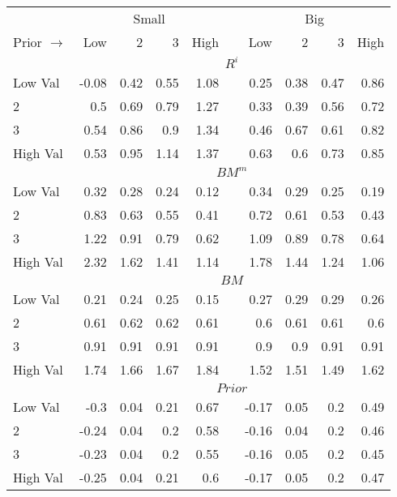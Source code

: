 
\begin{tabular}{lrrrrlrrrr}
  \toprule
    & \multicolumn{4}{c}{Small} & & \multicolumn{4}{c}{Big} \\
      \cmidrule(r){2-5} \cmidrule(r){7-10}
  Prior $\rightarrow$ & Low & 2 & 3 & High & & Low & 2 & 3 & High \\ 
  \midrule
  

    & \multicolumn{9}{c}{$R^i$} \\
    Low Val    & -0.08  & 0.42  & 0.55  & 1.08  & & 0.25  & 0.38  & 0.47  & 0.86  \\
           2   & 0.5  & 0.69  & 0.79  & 1.27  & & 0.33  & 0.39  & 0.56  & 0.72  \\
           3   & 0.54  & 0.86  & 0.9  & 1.34  & & 0.46  & 0.67  & 0.61  & 0.82  \\
    High Val   & 0.53  & 0.95  & 1.14  & 1.37  & & 0.63  & 0.6  & 0.73  & 0.85  \\
    [1em]
  

    & \multicolumn{9}{c}{$BM^m$} \\
    Low Val    & 0.32  & 0.28  & 0.24  & 0.12  & & 0.34  & 0.29  & 0.25  & 0.19  \\
           2   & 0.83  & 0.63  & 0.55  & 0.41  & & 0.72  & 0.61  & 0.53  & 0.43  \\
           3   & 1.22  & 0.91  & 0.79  & 0.62  & & 1.09  & 0.89  & 0.78  & 0.64  \\
    High Val   & 2.32  & 1.62  & 1.41  & 1.14  & & 1.78  & 1.44  & 1.24  & 1.06  \\
    [1em]
  

    & \multicolumn{9}{c}{$BM$} \\
    Low Val    & 0.21  & 0.24  & 0.25  & 0.15  & & 0.27  & 0.29  & 0.29  & 0.26  \\
           2   & 0.61  & 0.62  & 0.62  & 0.61  & & 0.6  & 0.61  & 0.61  & 0.6  \\
           3   & 0.91  & 0.91  & 0.91  & 0.91  & & 0.9  & 0.9  & 0.91  & 0.91  \\
    High Val   & 1.74  & 1.66  & 1.67  & 1.84  & & 1.52  & 1.51  & 1.49  & 1.62  \\
    [1em]
  

    & \multicolumn{9}{c}{$Prior$} \\
    Low Val    & -0.3  & 0.04  & 0.21  & 0.67  & & -0.17  & 0.05  & 0.2  & 0.49  \\
           2   & -0.24  & 0.04  & 0.2  & 0.58  & & -0.16  & 0.04  & 0.2  & 0.46  \\
           3   & -0.23  & 0.04  & 0.2  & 0.55  & & -0.16  & 0.05  & 0.2  & 0.45  \\
    High Val   & -0.25  & 0.04  & 0.21  & 0.6  & & -0.17  & 0.05  & 0.2  & 0.47  \\
    [1em]
  


\end{tabular}
